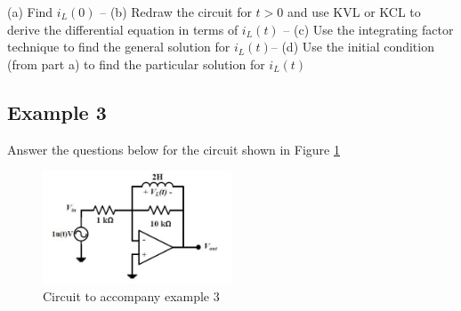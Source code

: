 \documentclass{handout}
\begin{document}
(a) Find $i_L(0)$ -- 
(b) Redraw the circuit for $t>0$ and use KVL or KCL to derive the differential equation in terms of $i_L(t)$ --
(c) Use the integrating factor technique to find the general solution for $i_L(t)$-- 
(d) Use the initial condition (from part a) to find the particular solution for  $i_L(t)$


\newpage
\clearpage
\pagebreak

\subsection{Example 3}
Answer the questions below for the circuit shown in Figure \ref{fig: Example3}
\begin{figure} [h!]
\centering
\includegraphics[width=0.5\textwidth]{Example3.jpg}
\caption{Circuit to accompany example 3}
\label{fig: Example3}
\end{figure}
\end{document}
